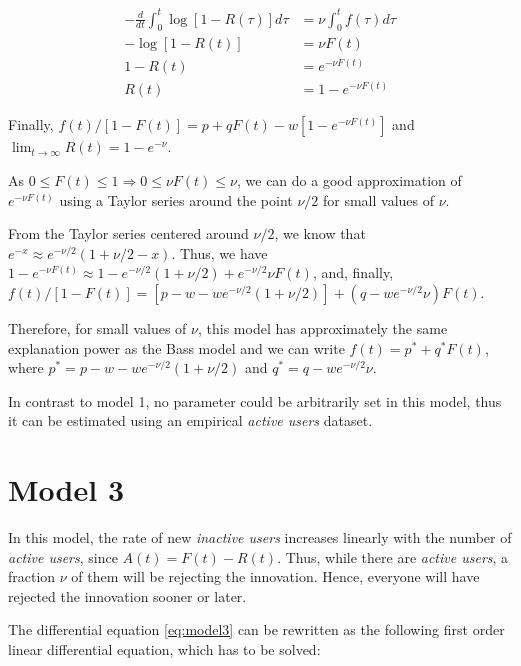 \begin{align}
	- \frac{d}{dt} \int_0^t \log[1 - R(\tau)] d\tau &= \nu \int_0^t f(\tau) d\tau \\
	- \log[1 - R(t)] &= \nu F(t) \\
	1 - R(t) &= e^{-\nu F(t)} \\
	R(t) &= 1 - e^{-\nu F(t)}
\end{align}

Finally, $f(t) / [1 - F(t)] = p + qF(t) - w[1 - e^{-\nu F(t)}]$ and $\lim_{t \rightarrow \infty} R(t) = 1 - e^{-\nu}$.

As $0 \leq F(t) \leq 1 \Rightarrow 0 \leq \nu F(t) \leq \nu$, we can do a good approximation of $e^{-\nu F(t)}$ using a Taylor series around the point $\nu/2$ for small values of $\nu$.

From the Taylor series centered around $\nu/2$, we know that $e^{-x} \approx e^{-\nu/2} (1 + \nu/2 - x)$. Thus, we have $1 - e^{-\nu F(t)} \approx 1 - e^{-\nu/2} (1 + \nu/2) + e^{-\nu/2} \nu F(t)$, and, finally, $f(t) / [1 - F(t)] = [p - w - w e^{-\nu/2} (1 + \nu/2)] + (q - w e^{-\nu/2} \nu)F(t)$.

Therefore, for small values of $\nu$, this model has approximately the same explanation power as the Bass model and we can write $f(t) = p^* + q^*F(t)$, where $p^* = p-w-we^{-\nu/2}(1+\nu/2)$ and $q^* = q - we^{-\nu/2}\nu$.

In contrast to model 1, no parameter could be arbitrarily set in this model, thus it can be estimated using an empirical \textit{active users} dataset.




\section{Model 3}

In this model, the rate of new \textit{inactive users} increases linearly with the number of \textit{active users}, since $A(t) = F(t) - R(t)$. Thus, while there are \textit{active users}, a fraction $\nu$ of them will be rejecting the innovation. Hence, everyone will have rejected the innovation sooner or later.

The differential equation \ref{eq:model3} can be rewritten as the following first order linear differential equation, which has to be solved:

